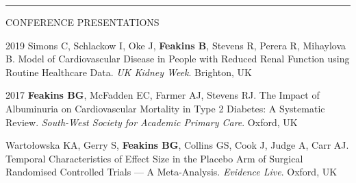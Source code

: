 \documentclass[10pt,a4paper]{article}
\begin{document}
\noindent\rule{\textwidth}{0.4pt}
\begin{cvlist}{CONFERENCE PRESENTATIONS}
  
  \item[2019]
  Simons C, Schlackow I, Oke J, \textbf{Feakins B}, Stevens R, Perera R, Mihaylova B. Model of Cardiovascular Disease in People with Reduced Renal Function using Routine Healthcare Data. \textit{UK Kidney Week}. Brighton, UK 
  
  \item[2017]
  \textbf{Feakins BG}, McFadden EC, Farmer AJ, Stevens RJ. The Impact of Albuminuria on Cardiovascular Mortality in Type 2 Diabetes: A Systematic Review. \textit{South-West Society for Academic Primary Care}. Oxford, UK
  
  \item[]
  Warto\l{}owska KA, Gerry S, \textbf{Feakins BG}, Collins GS, Cook J, Judge A, Carr AJ. Temporal Characteristics of Effect Size in the Placebo Arm of Surgical Randomised Controlled Trials --- A Meta-Analysis. \textit{Evidence Live}. Oxford, UK
  
\end{cvlist}
\end{document}
